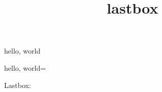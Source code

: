 \documentclass{amsart}
\title{lastbox}
\begin{document}
\maketitle

hello, world

hello, \hbox{world}=\lastbox

Lastbox: 
\end{document}
